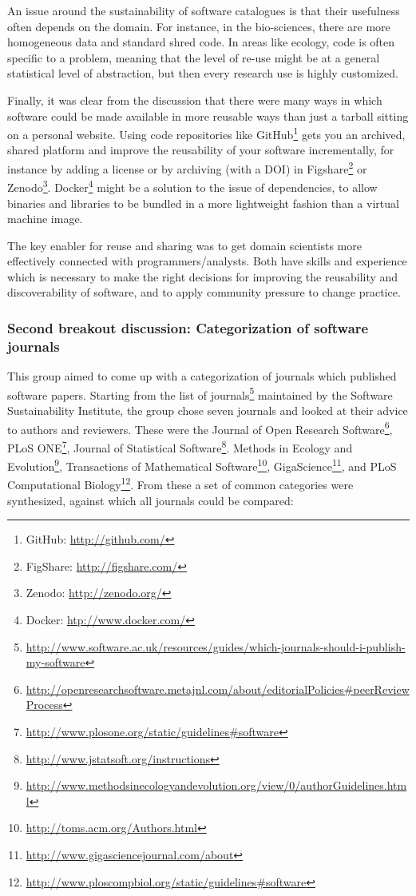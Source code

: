 \documentclass[11pt, oneside]{amsart}
\begin{document}
An issue around the sustainability of software catalogues is that their
usefulness often depends on the domain. For instance, in the bio-sciences, there
are more homogeneous data and standard shred code. In areas like ecology,
code is often specific to a problem, meaning that the level of re-use might
be at a general statistical level of abstraction, but then every research
use is highly customized.

Finally, it was clear from the discussion that there were many ways in which
software could be made available in more reusable ways than just a tarball
sitting on a personal website. Using code repositories like
GitHub\footnote{GitHub: \url{http://github.com/}} gets you an archived, shared
platform and improve the reusability of your software incrementally, for
instance by adding a license or by archiving (with a DOI) in
Figshare\footnote{FigShare: \url{http://figshare.com/}} or
Zenodo\footnote{Zenodo: \url{http://zenodo.org/}}. Docker\footnote{Docker:
\url{htp://www.docker.com/}} might be a solution to the issue of dependencies,
to allow binaries and libraries to be bundled in a more lightweight fashion than
a virtual machine image.

The key enabler for reuse and sharing was to get domain scientists more
effectively connected with programmers/analysts. Both have skills and experience
which is necessary to make the right decisions for improving the reusability and
discoverability of software, and to apply community pressure to change practice.

\subsubsection{Second breakout discussion: Categorization of software journals}

This group aimed to come up with a categorization of journals which published
software papers. Starting from the list of
journals\footnote{\url{http://www.software.ac.uk/resources/guides/which-journals-should-i-publish-my-software}}
maintained by the Software Sustainability Institute, the group chose seven
journals and looked at their advice to authors and reviewers. These were the
Journal of Open Research
Software\footnote{\url{http://openresearchsoftware.metajnl.com/about/editorialPolicies\#peerReviewProcess}},
PLoS ONE\footnote{\url{http://www.plosone.org/static/guidelines\#software}},
Journal of Statistical
Software\footnote{\url{http://www.jstatsoft.org/instructions}}. Methods in
Ecology and
Evolution\footnote{\url{http://www.methodsinecologyandevolution.org/view/0/authorGuidelines.html}},
Transactions of Mathematical
Software\footnote{\url{http://toms.acm.org/Authors.html}},
GigaScience\footnote{\url{http://www.gigasciencejournal.com/about}}, and PLoS
Computational
Biology\footnote{\url{http://www.ploscompbiol.org/static/guidelines\#software}}.
%
From these a set of common categories were synthesized, against which all
journals could be compared:
\end{document}
